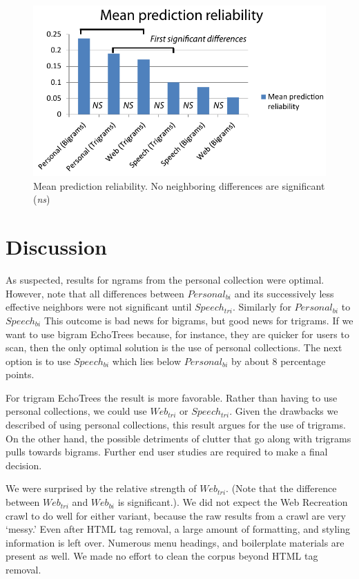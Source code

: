 \documentclass{sigchi}
\begin{document}
\begin{figure}
   \centering
   \includegraphics[width=\columnwidth]{Figs/meanPrediction.pdf}
   \caption{Mean prediction reliability. No neighboring differences are
     significant ({\em ns})}
   \label{fig:reliability}
\end{figure}

\section{Discussion}

As suspected, results for ngrams from the personal collection were
optimal. However, note that all differences between $Personal_{bi}$
and its successively less effective neighbors were not significant
until $Speech_{tri}$. Similarly for $Personal_{bi}$ to $Speech_{bi}$
This outcome is bad news for bigrams, but good news for trigrams. If
we want to use bigram EchoTrees because, for instance, they are
quicker for users to scan, then the only optimal solution is the use
of personal collections. The next option is to use $Speech_{bi}$ which
lies below $Personal_{bi}$ by about 8 percentage points.

For trigram EchoTrees the result is more favorable. Rather than having
to use personal collections, we could use $Web_{tri}$ or
$Speech_{tri}$.  Given the drawbacks we described of using personal
collections, this result argues for the use of trigrams. On the other
hand, the possible detriments of clutter that go along with trigrams
pulls towards bigrams. Further end user studies are required to make a
final decision.

We were surprised by the relative strength of $Web_{tri}$. (Note that
the difference between $Web_{tri}$ and $Web_{bi}$ is significant.). We
did not expect the Web Recreation crawl to do well for either variant,
because the raw results from a crawl are very `messy.' Even after HTML
tag removal, a large amount of formatting, and styling information is
left over. Numerous menu headings, and boilerplate materials are
present as well. We made no effort to clean the corpus beyond HTML tag
removal.
\end{document}

